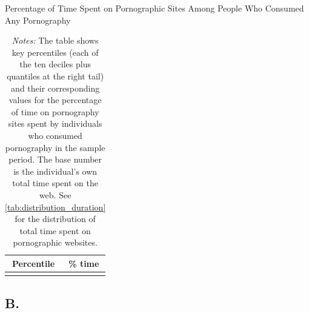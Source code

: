 \documentclass[12pt,twoside]{article}
\begin{document}
\begin{table}[ht] \centering \small \setlength\tabcolsep{10 pt}
	\caption{Percentage of Time Spent on Pornographic Sites Among People Who Consumed Any Pornography}
	\label{tab:distribution_prop_duration}
	\begin{adjustbox}{max width=\textwidth}
		\begin{tabular}{cr}
			\toprule
			\multicolumn{1}{c}{\textbf{Percentile}}&\multicolumn{1}{c}{\textbf{\% time}}\\
			\midrule
			\\
			\bottomrule
		\end{tabular}
	\end{adjustbox}
	\caption*{\footnotesize \emph{Notes:} The table shows key percentiles (each of the ten deciles plus quantiles at the right tail) and their corresponding values for the percentage of time on pornography sites spent by individuals who consumed pornography in the sample period. The base number is the individual's own total time spent on the web. See \cref{tab:distribution_duration} for the distribution of total time spent on pornographic websites.}
\end{table}
\clearpage
\setcounter{table}{0}
\setcounter{figure}{0}
\setcounter{equation}{0}
\FloatBarrier
\renewcommand{\thetable}{B\arabic{table}}
\renewcommand{\thefigure}{B\arabic{figure}}
\renewcommand{\theequation}{B\arabic{equation}}
\subsection{B. \smBTitle{}}\label{sm:smB}
\end{document}
